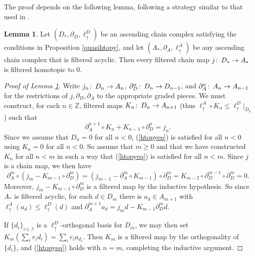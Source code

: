 \documentclass[11pt]{amsart}
\theoremstyle{definition}
\newtheorem{lemma}[theorem]{Lemma}
\theoremstyle{remark}
\numberwithin{equation}{section}
\def\co{\colon\thinspace}
\def\Z{\mathbb{Z}}
\begin{document}
The proof depends on the following lemma, following a strategy similar to that used in \cite[Lemma 10.4.6]{Wei}.

\begin{lemma} \label{nullhtopy}
	Let $(D_*,\partial_D,\ell_{\uparrow}^{D})$ be an ascending chain complex satisfying the conditions in Proposition \ref{quasihtopy}, and let $(A_*,\partial_A,\ell_{\uparrow}^{A})$ be any ascending chain complex that is filtered acyclic.  Then every filtered chain map $j\co D_*\to A_*$ is filtered homotopic to $0$.
\end{lemma}

\begin{proof}[Proof of Lemma \ref{nullhtopy}]
	Write $j_n\co D_n\to A_n$, $\partial_{D}^{n}\co D_n\to D_{n-1}$, and $\partial_{A}^{n}\co A_n\to A_{n-1}$ for the restrictions of $j,\partial_D,\partial_A$ to the appropriate graded pieces.  We must construct, for each $n\in \Z$, filtered maps $K_n\co D_n\to A_{n+1}$ (thus $\ell_{\uparrow}^A\circ K_n\leq \ell_{\uparrow}^{D}|_{D_n}$) such that \begin{equation}\label{htopyeq} \partial^{n+1}_{A}\circ K_n+K_{n-1}\circ \partial^n_{D}=j_n.    \end{equation}  Since we assume that $D_n=0$ for all $n<0$, (\ref{htopyeq}) is satisfied for all $n<0$ using $K_n=0$ for all $n<0$.  So assume that $m\geq 0$ and that we have constructed $K_n$ for all $n<m$ in such a way that (\ref{htopyeq}) is satisfied for all $n<m$.  Since $j$ is a chain map, we then have \[ \partial^m_A\circ(j_m-K_{m-1}\circ\partial^m_D)=(j_{m-1}-\partial^m_A\circ K_{m-1})\circ \partial^{m}_D=K_{m-2}\circ\partial^{m-1}_{D}\circ\partial^m_D=0.  \]
	Moreover, $j_m-K_{m-1}\circ\partial_{D}^{m}$ is a filtered map by the inductive hypothesis.  So since $A_*$ is filtered acyclic, for each $d\in D_m$ there is $a_d\in A_{m+1}$ with $\ell_{\uparrow}^A(a_d)\leq \ell_{\uparrow}^D(d)$ and $\partial_{A}^{m+1}a_d=j_md-K_{m-1}\partial_D^md$.  
	
	If $\{d_i\}_{i\in\mathcal{I}}$ is a $\ell_{\uparrow}^{D}$-orthogonal basis for $D_{m}$, we may then set $K_{m}\left(\sum_i r_id_i\right)=\sum_i r_ia_{d_i}$.  Then $K_m$ is a filtered map by the orthogonality of $\{d_i\}$, and (\ref{htopyeq}) holds with $n=m$, completing the inductive argument.  
\end{proof}
\end{document}
